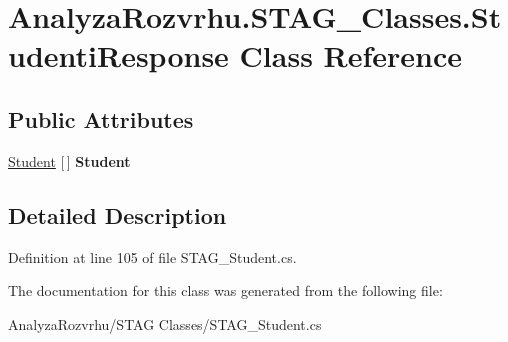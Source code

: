 \hypertarget{class_analyza_rozvrhu_1_1_s_t_a_g___classes_1_1_studenti_response}{}\section{Analyza\+Rozvrhu.\+S\+T\+A\+G\+\_\+\+Classes.\+Studenti\+Response Class Reference}
\label{class_analyza_rozvrhu_1_1_s_t_a_g___classes_1_1_studenti_response}
\subsection*{Public Attributes}
\begin{DoxyCompactItemize}
\item 
\mbox{\label{class_analyza_rozvrhu_1_1_s_t_a_g___classes_1_1_studenti_response_a363cad98471f8a5b8f8fd30f1e80c057}} 
\hyperlink{class_analyza_rozvrhu_1_1_s_t_a_g___classes_1_1_student}{Student} \mbox{[}$\,$\mbox{]} {\bfseries Student}
\end{DoxyCompactItemize}


\subsection{Detailed Description}


Definition at line 105 of file S\+T\+A\+G\+\_\+\+Student.\+cs.



The documentation for this class was generated from the following file\+:\begin{DoxyCompactItemize}
\item 
Analyza\+Rozvrhu/\+S\+T\+A\+G Classes/S\+T\+A\+G\+\_\+\+Student.\+cs\end{DoxyCompactItemize}
